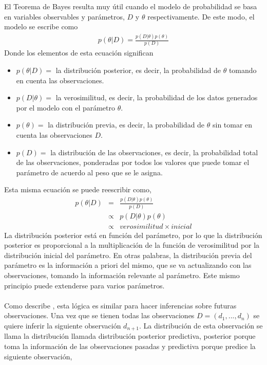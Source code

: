 El Teorema de Bayes resulta muy \'util cuando el modelo de probabilidad se basa en variables observables y  par\'ametros, $D$ y $\theta$ respectivamente. De este modo, el modelo se escribe como
\begin{align*}
p(\theta|D)=\frac{p(D|\theta)p(\theta)}{p(D)}
\end{align*}
Donde los elementos de esta ecuaci\'on significan
\begin{itemize}
\item $p(\theta|D)=$ la distribuci\'on posterior, es decir, la probabilidad de $\theta$ tomando en cuenta las observaciones.
\item $p(D|\theta)=$ la verosimilitud, es decir, la probabilidad de los datos generados por el modelo con el par\'ametro $\theta$.
\item $p(\theta)=$ la distribuci\'on previa, es decir, la probabilidad de $\theta$ sin tomar en cuenta las observaciones $D$.
\item $p(D)=$ la distribuci\'on de las observaciones, es decir, la probabilidad total de las observaciones, ponderadas por todos los valores que puede tomar el par\'ametro de acuerdo al peso que se le asigna.
\end{itemize}
Esta misma ecuaci\'on se puede reescribir como,
\begin{eqnarray*}
p(\theta|D)&=&\frac{p(D|\theta)p(\theta)}{p(D)}\\
		   &\propto & p(D|\theta)p(\theta)\\
		   &\propto & verosimilitud \times inicial
\end{eqnarray*}
La distribuci\'on posterior est\'a en funci\'on del par\'ametro, por lo que la distribuci\'on posterior es proporcional a la multiplicaci\'on de la funci\'on de verosimilitud por la distribuci\'on inicial del par\'ametro. En otras palabras, la distribuci\'on previa del par\'ametro es la informaci\'on a priori del mismo, que se va actualizando con las observaciones, tomando la informaci\'on relevante al par\'ametro. Este mismo principio puede extenderse para varios par\'ametros.\\
\\
Como describe \cite{gelman2014bayesian}, esta l\'ogica es similar para hacer inferencias sobre futuras observaciones. Una vez que se tienen todas las observaciones $D=(d_1,...,d_n)$ se quiere inferir la siguiente observaci\'on $d_{n+1}$. La distribuci\'on de esta observaci\'on se llama la distribuci\'on llamada distribuci\'on posterior predictiva, posterior porque toma la informaci\'on de las observaciones pasadas y predictiva porque predice la siguiente observaci\'on,
